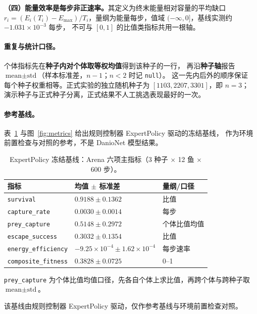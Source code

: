 \textbf{（四）能量效率是每步非正速率。}其定义为终末能量相对容量的平均缺口
$r_i=(E_i(T_i)-E_{\max})/T_i$，量纲为能量每步，值域 $(-\infty,0]$，基线实测约 $-1.031\times10^{-3}$ 每步，
不可与 $[0,1]$ 的比值类指标共用一根轴。

\paragraph{重复与统计口径。}个体指标先在\textbf{种子内对个体取等权均值}得到该种子的一行，
再沿\textbf{种子轴}报告 $\text{mean}\pm\text{std}$（样本标准差，$n-1$；$n<2$ 时记 \texttt{null}）。
这一先内后外的顺序保证每个种子权重相等。正式实验的独立随机种子为
$[1103,2207,3301]$，即 $n=3$；演示种子与正式种子分离，正式结果不人工挑选表现最好的一次。

\paragraph{参考基线。}表~\ref{tab:baseline} 与图~\ref{fig:metrics} 给出规则控制器 ExpertPolicy 驱动的冻结基线，
作为环境前置检查与对照的参考，不是 DanioNet 模型结果。

\begin{table}[H]
  \centering
  \caption{ExpertPolicy 冻结基线：Arena 六项主指标（3 种子 $\times$ 12 鱼 $\times$ 600 步）。}
  \label{tab:baseline}
  \small
  \begin{threeparttable}
  \begin{tabular}{lll}
    \toprule
    指标 & 均值 $\pm$ 标准差 & 量纲/口径 \\
    \midrule
    \texttt{survival}           & $0.9188 \pm 0.1362$ & 比值 \\
    \texttt{capture\_rate}      & $0.0030 \pm 0.0014$ & 每步 \\
    \texttt{prey\_capture}      & $0.5148 \pm 0.2972$ & 个体比值均值 \\
    \texttt{escape\_success}    & $0.3032 \pm 0.1354$ & 比值 \\
    \texttt{energy\_efficiency} & $-9.25\times10^{-4} \pm 1.62\times10^{-4}$ & 每步速率 \\
    \texttt{composite\_fitness} & $0.3828 \pm 0.0725$ & 0--1 \\
    \bottomrule
  \end{tabular}
  \begin{tablenotes}\footnotesize\raggedright
    \item \texttt{prey\_capture} 为个体比值均值口径，先各自个体上求比值，再跨个体与跨种子取 $\text{mean}\pm\text{std}$。
    \item 该基线由规则控制器 ExpertPolicy 驱动，仅作参考基线与环境前置检查对照。
  \end{tablenotes}
  \end{threeparttable}
\end{table}

